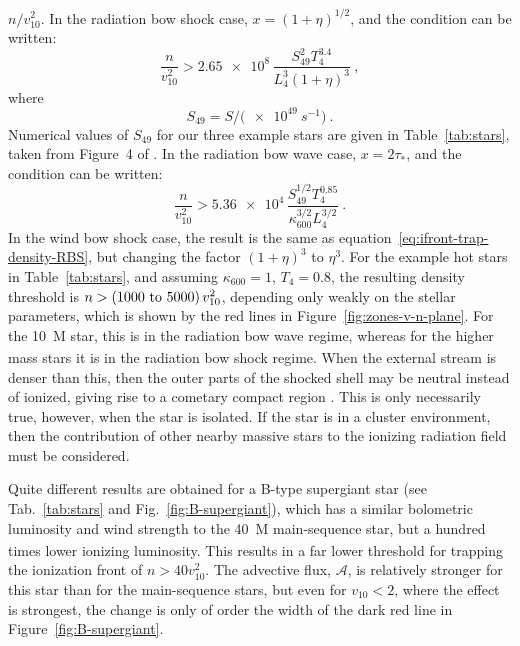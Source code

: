 \message{ !name(dusty-bow-wave.tex)}\documentclass[useAMS, usenatbib, a4paper]{mnras}
\begin{document}
\(n / v_{10}^2\).  In the radiation bow shock case,
\(x = (1 + \eta)^{1/2}\), and the condition can be written:
\begin{equation}
  \label{eq:ifront-trap-density-RBS}
  \frac{n}{v_{10}^2} > \num{2.65e8} \, \frac{S_{49}^2 T_4^{3.4}}{L_4^3 (1 + \eta)^3} \ , 
\end{equation}
where
\begin{equation*}
  S_{49} = S / \bigl( \SI{e49}{s^{-1}} \bigr) \ .
\end{equation*}
Numerical values of \(S_{49}\) for our three example stars are given
in Table~\ref{tab:stars}, taken from Figure~4 of
\citet{Sternberg:2003a}.  In the radiation bow wave case,
\(x = 2\tau_*\), and the condition can be written:
\begin{equation}
  \label{eq:ifront-trap-taustar-RBW}
  \frac{n}{v_{10}^2} > \num{5.36e4} \, \frac{S_{49}^{1/2} T_4^{0.85} }{\kappa_{600}^{3/2} L_4^{3/2}} \ . 
\end{equation}
In the wind bow shock case, the result is the same as
equation~\eqref{eq:ifront-trap-density-RBS}, but changing the factor
\((1 + \eta)^3\) to \(\eta^3\).  For the example hot stars in
Table~\ref{tab:stars}, and assuming \(\kappa_{600} = 1\),
\(T_4 = 0.8\), the resulting density threshold is
\(n > (\text{\numrange{1000}{5000}})\, v_{10}^2\), depending only
weakly on the stellar parameters, which is shown by the red lines in
Figure~\ref{fig:zones-v-n-plane}.  For the \SI{10}{M_\odot} star, this is
in the radiation bow wave regime, whereas for the higher mass stars it
is in the radiation bow shock regime.  When the external stream is
denser than this, then the outer parts of the shocked shell may be
neutral instead of ionized, giving rise to a cometary compact \hii{}
region \citep{Mac-Low:1991a, Arthur:2006a}.  This is only necessarily
true, however, when the star is isolated.  If the star is in a cluster
environment, then the contribution of other nearby massive stars to
the ionizing radiation field must be considered.

Quite different results are obtained for a B-type supergiant star (see
Tab.~\ref{tab:stars} and Fig.~\ref{fig:B-supergiant}), which has a
similar bolometric luminosity and wind strength to the \SI{40}{M_\odot}
main-sequence star, but a hundred times lower ionizing luminosity.
This results in a far lower threshold for trapping the ionization
front of \(n > 40 v_{10}^2\).  The advective flux, \(\mathcal{A}\), is
relatively stronger for this star than for the main-sequence stars, but
even for \(v_{10} < 2\), where the effect is strongest, the change is
only of order the width of the dark red line in
Figure~\ref{fig:B-supergiant}.
\end{document}
